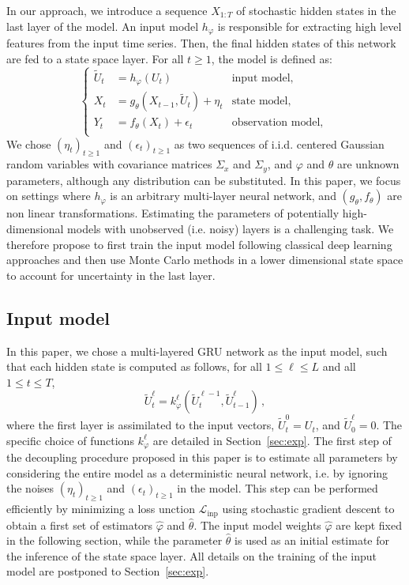 \documentclass{article}
\begin{document}
In our approach, we introduce a sequence $X_{1:T}$ of stochastic hidden states in the last layer of the model.
An input model $h_\varphi$ is responsible for extracting high level features from the input time series. Then, the final hidden states of this network are fed to a state space layer.
For all $t \geq 1$, the model is defined as:
\begin{equation*}
	\left\{
	\begin{aligned}
		\widetilde U_t & = h_\varphi(U_t)                             & \text{input model, }       \\
		X_t            & = g_\theta(X_{t-1}, \widetilde U_t) + \eta_t & \text{state model, }       \\
		Y_t            & = f_\theta(X_t) + \epsilon_t                 & \text{observation model, } \\
	\end{aligned}
	\right.
\end{equation*}
We chose $(\eta_t)_{t\geq 1}$ and $(\epsilon_t)_{t\geq 1}$ as two sequences of i.i.d. centered Gaussian random variables with covariance matrices $\Sigma_x$ and $\Sigma_y$, and $\varphi$ and $\theta$ are unknown parameters, although any distribution can be substituted.
In this paper, we focus on settings where $h_\varphi$ is an arbitrary multi-layer neural network, and $(g_\theta, f_\theta)$ are non linear transformations.
Estimating the parameters of potentially high-dimensional models with unobserved (i.e. noisy) layers is a challenging task.
We therefore propose to first train the input model following classical deep learning approaches and then use Monte Carlo methods in a lower dimensional state space to account for uncertainty in the last layer.

\subsection{Input model}%
\label{sub:input_model}
In this paper, we chose a multi-layered GRU network as the input model, such that each hidden state is computed as follows, for all $1 \leq \ell \leq L$ and all $1 \leq t \leq T$,
$$
	\tilde U^\ell_t = k_\varphi^\ell(\widetilde U^{\ell-1}_t, \widetilde U^\ell_{t-1})\,,
$$
where the first layer is assimilated to the input vectors, $\widetilde U_t^0 = U_t$, and $\widetilde U^\ell_0 = 0$. The specific choice of functions $ k_\varphi^\ell$ are detailed in Section~\ref{sec:exp}.
The first step of the decoupling procedure proposed in this paper is to estimate all parameters by considering the entire model as a deterministic neural network, i.e. by ignoring the noises $(\eta_t)_{t\geq 1}$ and $(\epsilon_t)_{t\geq 1}$ in the model.
This step can be performed efficiently by minimizing a loss unction $\mathcal{L}_{\mathrm{inp}}$ using stochastic gradient descent to obtain a first set of estimators $\widehat \varphi$ and $ \widehat \theta$.
The input model weights $\widehat \varphi$ are kept fixed in the following section, while the parameter $\widehat \theta$ is used as an initial estimate for the inference of the state space layer.
All details on the training of the input model are postponed to Section~\ref{sec:exp}.
\end{document}
